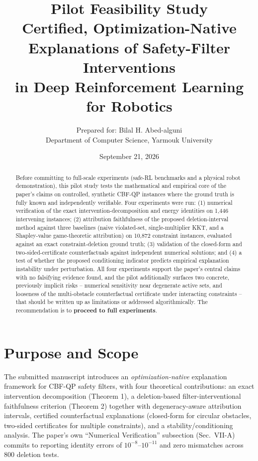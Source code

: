 \documentclass[11pt]{article}
\title{\bfseries Pilot Feasibility Study\\[2pt]
\large Certified, Optimization-Native Explanations of Safety-Filter Interventions\\
in Deep Reinforcement Learning for Robotics}
\author{Prepared for: Bilal H. Abed-alguni \\ Department of Computer Science, Yarmouk University}
\date{September 21, 2026}
\begin{document}
\maketitle

\begin{abstract}
\noindent
Before committing to full-scale experiments (safe-RL benchmarks and a physical
robot demonstration), this pilot study tests the mathematical and empirical
core of the paper's claims on controlled, synthetic CBF-QP instances where the
ground truth is fully known and independently verifiable. Four experiments were
run: (1) numerical verification of the exact intervention-decomposition and
energy identities on 1{,}446 intervening instances; (2) attribution
faithfulness of the proposed deletion-interval method against three baselines
(naive violated-set, single-multiplier KKT, and a Shapley-value game-theoretic
attribution) on 10{,}872 constraint instances, evaluated against an exact
constraint-deletion ground truth; (3) validation of the closed-form and
two-sided-certificate counterfactuals against independent numerical solutions;
and (4) a test of whether the proposed conditioning indicator predicts
empirical explanation instability under perturbation. All four experiments
support the paper's central claims with no falsifying evidence found, and the
pilot additionally surfaces two concrete, previously implicit risks --
numerical sensitivity near degenerate active sets, and looseness of the
multi-obstacle counterfactual certificate under interacting constraints -- that
should be written up as limitations or addressed algorithmically. The
recommendation is to \textbf{proceed to full experiments}.
\end{abstract}

\tableofcontents

\section{Purpose and Scope}

The submitted manuscript introduces an \emph{optimization-native} explanation
framework for CBF-QP safety filters, with four theoretical contributions: an
exact intervention decomposition (Theorem 1), a deletion-based
filter-interventional faithfulness criterion (Theorem 2) together with
degeneracy-aware attribution intervals, certified counterfactual explanations
(closed-form for circular obstacles, two-sided certificates for multiple
constraints), and a stability/conditioning analysis. The paper's own
``Numerical Verification'' subsection (Sec.~VII-A) commits to reporting
identity errors of $10^{-8}$--$10^{-11}$ and zero mismatches across 800
deletion tests.
\end{document}
